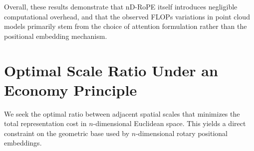 \documentclass{article}
\theoremstyle{plain}
\theoremstyle{definition}
\theoremstyle{remark}
\begin{document}
Overall, these results demonstrate that nD-RoPE itself introduces negligible
computational overhead, and that the observed FLOPs variations in point cloud
models primarily stem from the choice of attention formulation rather than the
positional embedding mechanism.

\begin{table}[t]
\centering
\caption{Comprehensive Computational Cost Analysis. Comparisons across Image, Point Cloud, and Video tasks.  For Point Transformers, we explicitly compare Vector Attention vs. Dot-Product Attention variants. Note that applying nD-RoPE with Vector Attention increases cost, but enabling Dot-Product Attention (Ours) significantly reduces FLOPs.}
\label{tab:unified_flops}
\end{table}

\section{Optimal Scale Ratio Under an Economy Principle}
\label{sec:optimal_scale_ratio}
We seek the optimal ratio between adjacent spatial scales that minimizes the total representation cost in \(n\)-dimensional Euclidean space. This yields a direct constraint on the geometric base used by \(n\)-dimensional rotary positional embeddings.
\end{document}
